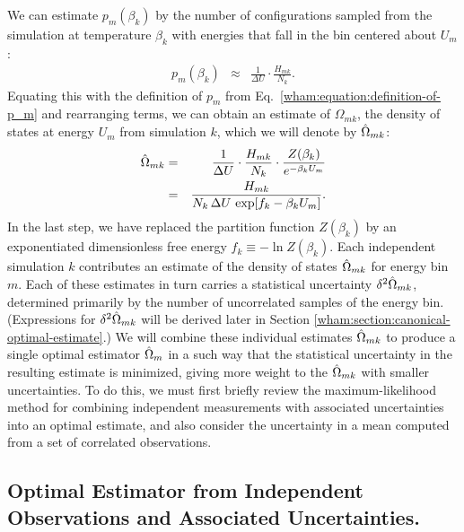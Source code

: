 We can estimate $p_m(\beta_k)$ by the number of configurations sampled from the simulation at temperature $\beta_k$ with energies that fall in the bin centered about $U_m$:
\begin{eqnarray}
p_m(\beta_k) &\approx& \frac{1}{\Delta U} \cdot \frac{H_{mk}}{N_k} .
\end{eqnarray}
Equating this with the definition of $p_m$ from Eq.\ \ref{wham:equation:definition-of-p_m} and rearranging terms, we can obtain an estimate of $\Omega_{mk}$, the density of states at energy $U_m$ from simulation $k$, which we will denote by $\hat{\Omega}_{mk}$:
\begin{eqnarray}
\hat{\Omega}_{mk} &=& \frac{1}{\Delta U} \cdot \frac{H_{mk}}{N_k} \cdot \frac{Z(\beta_k)}{e^{-\beta_k U_m}} \nonumber \\
&=& \frac{H_{mk}}{N_k \, \Delta U \, \exp[f_k - \beta_k U_m]}. \label{wham:equation:single-temperature-dos-estimate}
\end{eqnarray}
In the last step, we have replaced the partition function $Z(\beta_k)$ by an exponentiated dimensionless free energy $f_k \equiv - \ln Z(\beta_k)$.  Each independent simulation $k$ contributes an estimate of the density of states $\hat{\Omega}_{mk}$ for energy bin $m$.  Each of these estimates in turn carries a statistical uncertainty $\delta^2 \hat{\Omega}_{mk}$, determined primarily by the number of uncorrelated samples of the energy bin.  (Expressions for $\delta^2 \hat{\Omega}_{mk}$ will be derived later in Section \ref{wham:section:canonical-optimal-estimate}.)  We will combine these individual estimates $\hat{\Omega}_{mk}$ to produce a single optimal estimator $\hat{\Omega}_{m}$ in a such way that the statistical uncertainty in the resulting estimate is minimized, giving more weight to the $\hat{\Omega}_{mk}$ with smaller uncertainties.  To do this, we must first briefly review the maximum-likelihood method for combining independent measurements with associated uncertainties into an optimal estimate, and also consider the uncertainty in a mean computed from a set of correlated observations.

\subsection{Optimal Estimator from Independent Observations and Associated Uncertainties.}
\label{wham:section:combining-independent-estimates}

